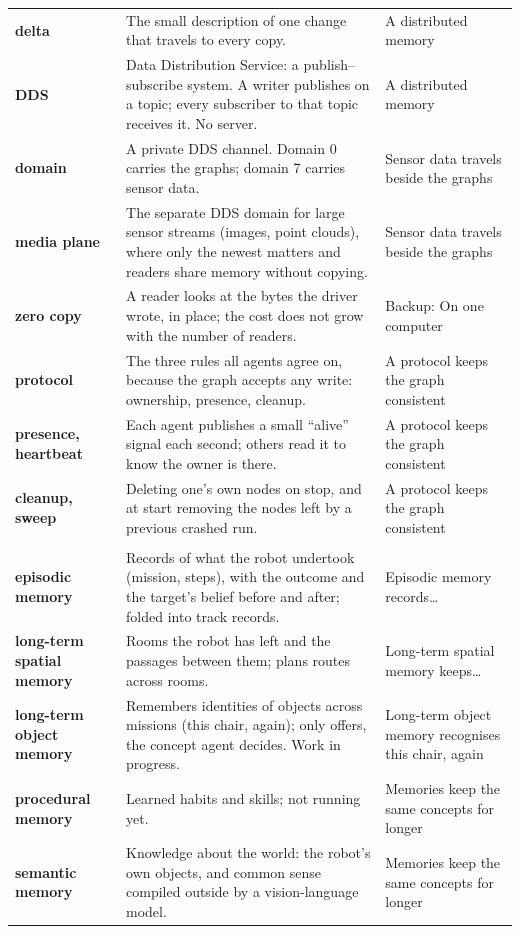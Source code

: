 \documentclass[11pt]{article}
\begin{document}
\begin{longtable}{@{}>{\raggedright\bfseries}p{2.8cm} p{8.9cm} >{\raggedright\arraybackslash}p{4.2cm}@{}}
delta & The small description of one change that travels to every copy. & A distributed memory\\
DDS & Data Distribution Service: a publish--subscribe system. A writer publishes on a topic; every subscriber to that topic receives it. No server. & A distributed memory\\
domain & A private DDS channel. Domain 0 carries the graphs; domain 7 carries sensor data. & Sensor data travels beside the graphs\\
media plane & The separate DDS domain for large sensor streams (images, point clouds), where only the newest matters and readers share memory without copying. & Sensor data travels beside the graphs\\
zero copy & A reader looks at the bytes the driver wrote, in place; the cost does not grow with the number of readers. & Backup: On one computer\\
protocol & The three rules all agents agree on, because the graph accepts any write: ownership, presence, cleanup. & A protocol keeps the graph consistent\\
presence, heartbeat & Each agent publishes a small ``alive'' signal each second; others read it to know the owner is there. & A protocol keeps the graph consistent\\
cleanup, sweep & Deleting one's own nodes on stop, and at start removing the nodes left by a previous crashed run. & A protocol keeps the graph consistent\\
\midrule
\multicolumn{3}{@{}l}{\emph{Memories}}\\
episodic memory & Records of what the robot undertook (mission, steps), with the outcome and the target's belief before and after; folded into track records. & Episodic memory records\ldots\\
long-term spatial memory & Rooms the robot has left and the passages between them; plans routes across rooms. & Long-term spatial memory keeps\ldots\\
long-term object memory & Remembers identities of objects across missions (this chair, again); only offers, the concept agent decides. Work in progress. & Long-term object memory recognises this chair, again\\
procedural memory & Learned habits and skills; not running yet. & Memories keep the same concepts for longer\\
semantic memory & Knowledge about the world: the robot's own objects, and common sense compiled outside by a vision-language model. & Memories keep the same concepts for longer\\

\end{longtable}
\end{document}
